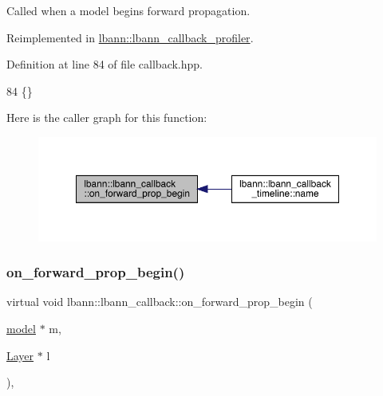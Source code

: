 Called when a model begins forward propagation. 

Reimplemented in \hyperlink{classlbann_1_1lbann__callback__profiler_a027fe89a27c52ae80a1982f96dd62455}{lbann\+::lbann\+\_\+callback\+\_\+profiler}.



Definition at line 84 of file callback.\+hpp.


\begin{DoxyCode}
84 \{\}
\end{DoxyCode}
Here is the caller graph for this function\+:\nopagebreak
\begin{figure}[H]
\begin{center}
\leavevmode
\includegraphics[width=350pt]{classlbann_1_1lbann__callback_a22ed977371173105b4aad3a20b9c59dc_icgraph}
\end{center}
\end{figure}
\mbox{\label{classlbann_1_1lbann__callback_ab96adb1d77180e00fdd668cd381323fd}} 
\subsubsection{\texorpdfstring{on\+\_\+forward\+\_\+prop\+\_\+begin()}{on\_forward\_prop\_begin()}\hspace{0.1cm}{\footnotesize\ttfamily [2/2]}}
{\footnotesize\ttfamily virtual void lbann\+::lbann\+\_\+callback\+::on\+\_\+forward\+\_\+prop\+\_\+begin (\begin{DoxyParamCaption}\item[{\hyperlink{classlbann_1_1model}{model} $\ast$}]{m,  }\item[{\hyperlink{classlbann_1_1Layer}{Layer} $\ast$}]{l }\end{DoxyParamCaption})\hspace{0.3cm}{\ttfamily [inline]}, {\ttfamily [virtual]}}


